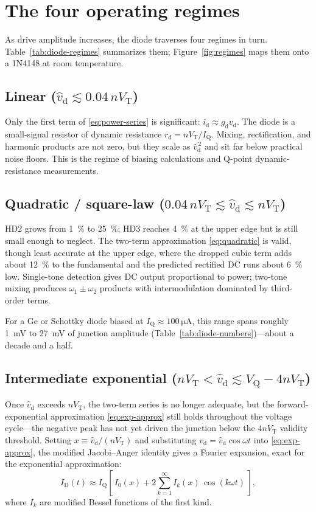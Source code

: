 \documentclass[12pt]{article}
\newcommand{\ID}{I_{\mathrm{D}}}
\newcommand{\VT}{V_{\mathrm{T}}}
\newcommand{\VQ}{V_{\mathrm{Q}}}
\newcommand{\IQ}{I_{\mathrm{Q}}}
\newcommand{\vd}{v_{\mathrm{d}}}
\newcommand{\id}{i_{\mathrm{d}}}
\newcommand{\gd}{g_{\mathrm{d}}}
\newcommand{\rd}{r_{\mathrm{d}}}
\newcommand{\vhd}{\hat{v}_{\mathrm{d}}}
\begin{document}
\section*{The four operating regimes}

As drive amplitude increases, the diode traverses four regimes in turn. Table~\ref{tab:diode-regimes} summarizes them; Figure~\ref{fig:regimes} maps them onto a 1N4148 at room temperature.

\subsection*{Linear ($\vhd \lesssim 0.04\,n\VT$)}

Only the first term of \eqref{eq:power-series} is significant: $\id \approx \gd \vd$.
The diode is a small-signal resistor of dynamic resistance $\rd = n\VT/\IQ$.
Mixing, rectification, and harmonic products are not zero, but they scale as $\vhd^{\,2}$ and sit far below practical noise floors.
This is the regime of biasing calculations and Q-point dynamic-resistance measurements.

\subsection*{Quadratic / square-law ($0.04\,n\VT \lesssim \vhd \lesssim n\VT$)}

HD2 grows from \SI{1}{\percent} to \SI{25}{\percent}; HD3 reaches \SI{4}{\percent} at the upper edge but is still small enough to neglect.
The two-term approximation \eqref{eq:quadratic} is valid, though least accurate at the upper edge, where the dropped cubic term adds about \SI{12}{\percent} to the fundamental and the predicted rectified DC runs about \SI{6}{\percent} low.
Single-tone detection gives DC output proportional to power; two-tone mixing produces $\omega_1 \pm \omega_2$ products with intermodulation dominated by third-order terms.

For a Ge or Schottky diode biased at $\IQ \approx \SI{100}{\micro\ampere}$, this range spans roughly \SI{1}{\milli\volt} to \SI{27}{\milli\volt} of junction amplitude (Table~\ref{tab:diode-numbers})---about a decade and a half.

\subsection*{Intermediate exponential ($n\VT < \vhd \lesssim \VQ - 4n\VT$)}

Once $\vhd$ exceeds $n\VT$, the two-term series is no longer adequate, but the forward-exponential approximation \eqref{eq:exp-approx} still holds throughout the voltage cycle---the negative peak has not yet driven the junction below the $4n\VT$ validity threshold. Setting $x \equiv \vhd/(n\VT)$ and substituting $\vd = \vhd\cos\omega t$ into \eqref{eq:exp-approx}, the modified Jacobi--Anger identity gives a Fourier expansion, exact for the exponential approximation:
\begin{equation}
  \ID(t) \approx \IQ \left[\, I_0(x) + 2 \sum_{k=1}^{\infty} I_k(x)\, \cos(k \omega t) \,\right],
  \label{eq:bessel}
\end{equation}
where $I_k$ are modified Bessel functions of the first kind.
\end{document}
